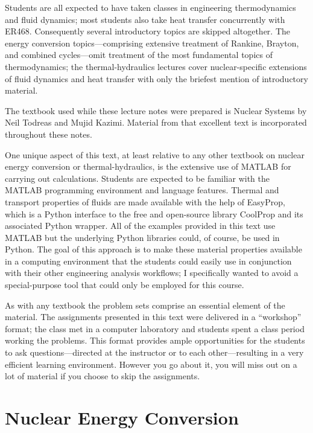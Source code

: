 \documentclass{tufte-book}
\begin{document}
Students are all expected to have taken classes in engineering thermodynamics and fluid dynamics; most students also take heat transfer concurrently with ER468.  Consequently several introductory topics are skipped altogether.  The energy conversion topics---comprising extensive treatment of Rankine, Brayton, and combined cycles---omit treatment of the most fundamental topics of thermodynamics; the thermal-hydraulics lectures cover nuclear-specific extensions of fluid dynamics and heat transfer with only the briefest mention of introductory material.

The textbook used while these lecture notes were prepared is Nuclear Systems by Neil Todreas and Mujid Kazimi.\cite{todreasNS}  Material from that excellent text is incorporated throughout these notes.

One unique aspect of this text, at least relative to any other textbook on nuclear energy conversion or thermal-hydraulics, is the extensive use of MATLAB\cite{matlab} for carrying out calculations.  Students are expected to be familiar with the MATLAB programming environment and language features.  Thermal and transport properties of fluids are made available with the help of EasyProp,\cite{easyprop} which is a Python interface to the free and open-source library CoolProp and its associated Python wrapper.\cite{coolprop_wrapper} All of the examples provided in this text use MATLAB but the underlying Python libraries could, of course, be used in Python. The goal of this approach is to make these material properties available in a computing environment that the students could easily use in conjunction with their other engineering analysis workflows; I specifically wanted to avoid a special-purpose tool that could only be employed for this course.  

As with any textbook the problem sets comprise an essential element of the material.  The assignments presented in this text were delivered in a ``workshop'' format; the class met in a computer laboratory and students spent a class period working the problems.  This format provides ample opportunities for the students to ask questions---directed at the instructor or to each other---resulting in a very efficient learning environment.  However you go about it, you will miss out on a lot of material if you choose to skip the assignments.



\mainmatter

\part{Nuclear Energy Conversion}
\end{document}
